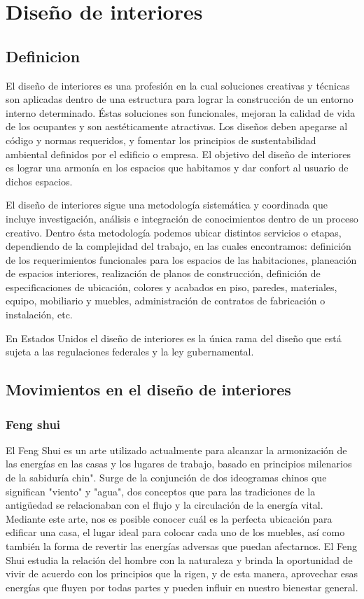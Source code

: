\section{Diseño de interiores}
\subsection{Definicion}
El diseño de interiores es una profesión en la cual soluciones creativas y técnicas son aplicadas dentro de una estructura para lograr la construcción de un entorno interno determinado. Éstas soluciones son funcionales, mejoran la calidad de vida de los ocupantes y son aestéticamente atractivas. Los diseños deben apegarse al código y normas requeridos, y fomentar los principios de sustentabilidad ambiental definidos por el edificio o empresa. El objetivo del diseño de interiores es lograr una armonía en los espacios que habitamos y dar confort al usuario de dichos espacios\cite{B01}. \par
El diseño de interiores sigue una metodología sistemática y coordinada que incluye investigación, análisis e integración de conocimientos dentro de un proceso creativo. Dentro ésta metodología podemos ubicar distintos servicios o etapas, dependiendo de la complejidad del trabajo, en las cuales encontramos: definición de los requerimientos funcionales para los espacios de las habitaciones, planeación de espacios interiores, realización de planos de construcción, definición de especificaciones de ubicación, colores y acabados en piso, paredes, materiales, equipo, mobiliario y muebles, administración de contratos de fabricación o instalación, etc.\par
En Estados Unidos el diseño de interiores es la única rama del diseño que está sujeta a las regulaciones federales y la ley gubernamental\cite{B02}.
\subsection{Movimientos en el diseño de interiores}

\subsubsection{Feng shui}
El Feng Shui es un arte utilizado actualmente para alcanzar la armonización de las energías en las casas y los lugares de trabajo, basado en principios milenarios de la sabiduría chin"\cite{B26}. Surge de la conjunción de dos ideogramas chinos que significan "viento" y "agua", dos conceptos que para las tradiciones de la antigüedad se relacionaban con el flujo y la circulación de la energía vital. Mediante este arte, nos es posible conocer cuál es la perfecta ubicación para edificar una casa, el lugar ideal para colocar cada uno de los muebles, así como también la forma de revertir las energías adversas que puedan afectarnos. El Feng Shui estudia la relación del hombre con la naturaleza y brinda la oportunidad de vivir de acuerdo con los principios que la rigen, y de esta manera, aprovechar esas energías que fluyen por todas partes y pueden influir en nuestro bienestar general.

